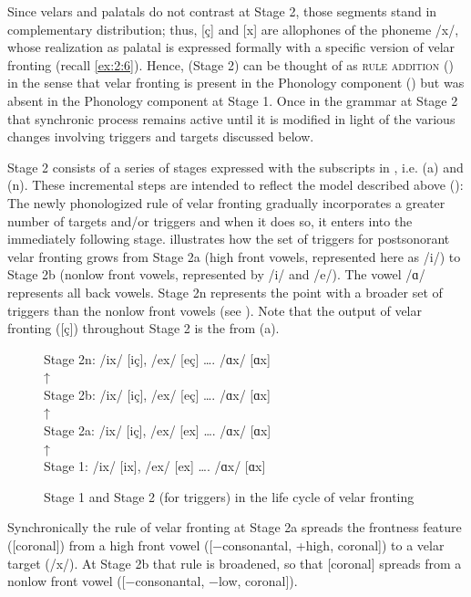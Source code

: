 \begin{xlist}
\begin{xlist}
Since velars and palatals do not contrast at Stage 2, those segments stand in complementary distribution; thus, [ç] and [x] are allophones of the phoneme /x/, whose realization as palatal is expressed formally with a specific version of velar fronting (recall \ref{ex:2:6}). Hence,  (Stage 2) can be thought of as \textsc{rule addition} (\citealt{King1969, RingeEska2013}) in the sense that velar fronting is present in the Phonology component () but was absent in the Phonology component at Stage 1. Once in the grammar at Stage 2 that synchronic process remains active until it is modified in light of the various changes involving triggers and targets discussed below.

Stage 2 consists of a series of stages expressed with the subscripts in , i.e. (a) and (n). These incremental steps are intended to reflect the  model described above (): The newly phonologized rule of velar fronting gradually incorporates a greater number of targets and/or triggers and when it does so, it enters into the immediately following stage.  illustrates how the set of triggers for postsonorant velar fronting grows from Stage 2a (high front vowels, represented here as /i/) to Stage 2b (nonlow front vowels, represented by /i/ and /e/). The vowel /ɑ/ represents all back vowels. Stage 2n represents the point with a broader set of triggers than the nonlow front vowels (see ). Note that the output of velar fronting ([ç]) throughout Stage 2 is the  from (a).

\begin{figure}
  Stage 2n:    /ix/ [iç], /ex/ [eç] …. /ɑx/ [ɑx]\\
       ↑\\
  Stage 2b:    /ix/ [iç], /ex/ [eç] …. /ɑx/ [ɑx]\\
       ↑\\
  Stage 2a:    /ix/ [iç], /ex/ [ex] …. /ɑx/ [ɑx]\\
                  ↑\\
  Stage 1:  /ix/ [ix], /ex/ [ex] …. /ɑx/ [ɑx]
\caption{\label{fig:2.4}Stage 1 and Stage 2 (for triggers) in the life cycle of velar fronting}
\end{figure}

Synchronically the rule of velar fronting at Stage 2a spreads the frontness feature ([coronal]) from a high front vowel ([−consonantal, +high, coronal]) to a velar target (/x/). At Stage 2b that rule is broadened, so that [coronal] spreads from a nonlow front vowel ([−consonantal,     −low, coronal]).


\end{xlist}
\end{xlist}
